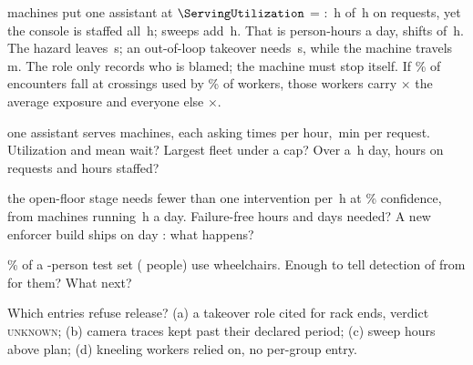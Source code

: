 \documentclass{studysheet}
\begin{document}
\begin{rightcol}
%
  { machines put one assistant at $\ServingUtilization$ = : \,h of \,h on
   requests, yet the console is staffed all \,h; sweeps add \,h. That is 
   person-hours a day,  shifts of \,h.}{}
%
  {The hazard leaves \,s; an out-of-loop takeover needs \,s, while the machine
   travels \,m. The role only records who is blamed; the machine must stop itself.}{}
%
  {If \% of encounters fall at crossings used by \% of workers, those
   workers carry $\times$ the average exposure and everyone else $\times$.}{}

\vspace{2pt}
\begin{qs}
\item \assumed{} one assistant serves  machines, each asking  times per hour,
  \,min per request. Utilization and mean wait? Largest fleet under a  cap? Over a
  \,h day, hours on requests and hours staffed?
\item \assumed{} the open-floor stage needs fewer than one intervention per \,h at
  \% confidence, from  machines running \,h a day. Failure-free
  hours and days needed? A new enforcer build ships on day : what happens?
\item \assumed{} \% of a -person test set ( people) use wheelchairs.
  Enough to tell detection of  from  for them? What next?
\item Which entries refuse release? (a) a takeover role cited for rack ends, verdict \textsc{unknown};
  (b) camera traces kept past their declared period; (c) sweep hours above plan; (d) kneeling workers
  relied on, no per-group entry.
\end{qs}
\end{rightcol}
\end{document}
